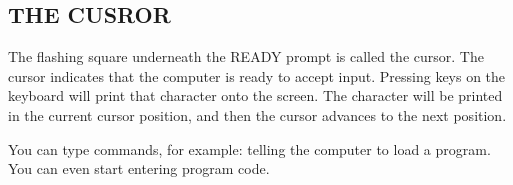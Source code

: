\subsection{THE CUSROR}

The flashing square underneath the READY prompt is called the cursor. The cursor indicates that the computer is ready to accept input. Pressing keys on the keyboard will print that character onto the screen. The character will be printed in the current cursor position, and then the cursor advances to the next position.

You can type commands, for example: telling the computer to load a program. You can even start entering program code.
